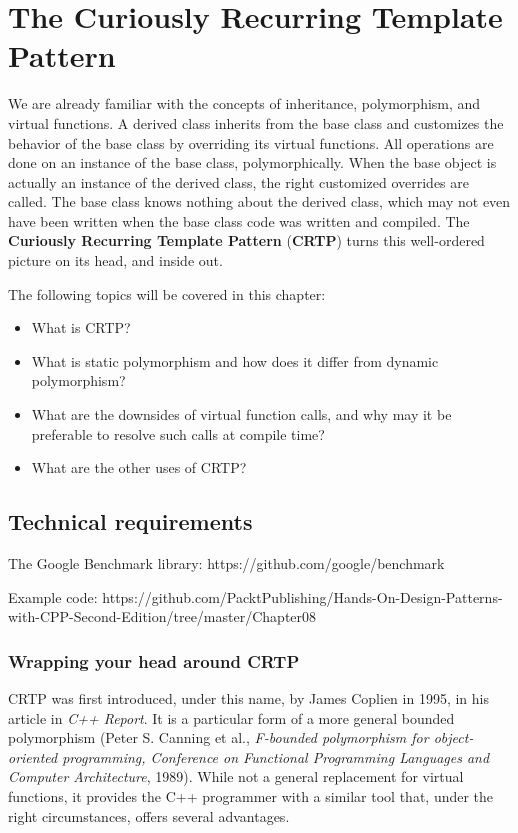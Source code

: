 ﻿\chapter{The Curiously Recurring Template Pattern}

We are already familiar with the concepts of inheritance, polymorphism, and virtual functions. A derived class inherits from the base class and customizes the behavior of the base class by overriding its virtual functions. All operations are done on an instance of the base class, polymorphically. When the base object is actually an instance of the derived class, the right customized overrides are called. The base class knows nothing about the derived class, which may not even have been written when the base class code was written and compiled. The \textbf{Curiously Recurring Template Pattern} (\textbf{CRTP}) turns this well-ordered picture on its head, and inside out.

The following topics will be covered in this chapter:

\begin{itemize}
\item
  What is CRTP?
\item
  What is static polymorphism and how does it differ from dynamic polymorphism?
\item
  What are the downsides of virtual function calls, and why may it be preferable to resolve such calls at compile time?
\item
  What are the other uses of CRTP?
\end{itemize}

\section{Technical requirements}

The Google Benchmark library: https://github.com/google/benchmark

Example code: https://github.com/PacktPublishing/Hands-On-Design-Patterns-with-CPP-Second-Edition/tree/master/Chapter08{}

\subsection{Wrapping your head around CRTP}

CRTP was first introduced, under this name, by James Coplien in 1995, in his article in \emph{C++ Report}. It is a particular form of a more general bounded polymorphism (Peter S. Canning et al., \emph{F-bounded polymorphism for object-oriented programming, Conference on Functional Programming Languages and Computer Architecture}, 1989). While not a general replacement for virtual functions, it provides the C++ programmer with a similar tool that, under the right circumstances, offers several advantages.

